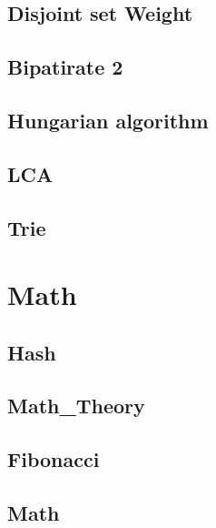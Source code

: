         \subsection{Disjoint set Weight}
                
        \subsection{Bipatirate 2}
                
        \subsection{Hungarian algorithm}
                
        \subsection{LCA}
                
        \subsection{Trie}
                

\section{Math}
        \subsection{Hash}
                
        \subsection{Math_Theory}
                
        \subsection{Fibonacci}
                
        \subsection{Math}
                
